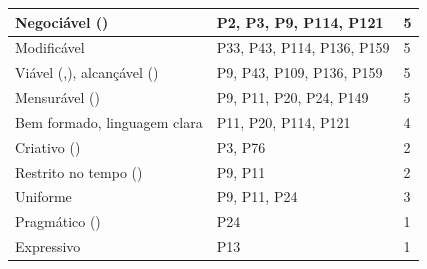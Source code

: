 \begin{table}[!t]
\begin{tabular}{|m{1.7cm}|m{5cm}|m{0.4cm}|}
\hline
Negociável (\cite{SMART_INVEST_2013}) & P2, P3, P9, P114, P121 & 5 \\ 
\hline
Modificável & P33, P43, P114, P136, P159 & 5 \\ 
\hline
Viável (\cite{Babok_2015},\cite{Babok_2009}), alcançável (\cite{SMART_INVEST_2013}) & P9, P43, P109, P136, P159 & 5 \\ 
\hline
Mensurável (\cite{SMART_INVEST_2013}) & P9, P11, P20, P24, P149 & 5 \\ 
\hline
Bem formado, linguagem clara & P11, P20, P114, P121 & 4 \\ 
\hline
Criativo (\cite{KANO84}) & P3, P76 & 2 \\ 
\hline
Restrito no tempo (\cite{SMART_INVEST_2013}) & P9, P11 & 2 \\ 
\hline
Uniforme & P9, P11, P24 & 3 \\ 
\hline
Pragmático (\cite{Saito_PQM_13}) & P24 & 1 \\ 
\hline
Expressivo & P13 & 1 \\
\hline
\end{tabular}
\end{table}